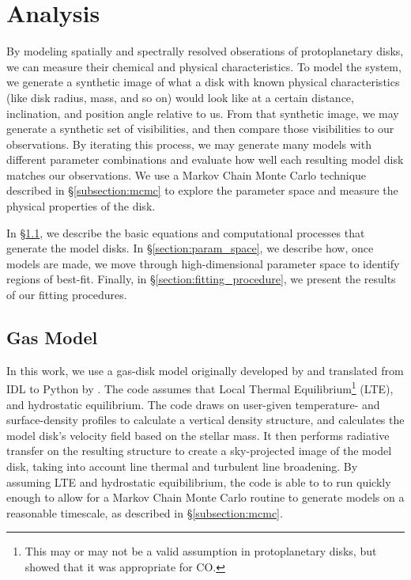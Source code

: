 \chapter{Analysis}
\label{chap:analysis}

By modeling spatially and spectrally resolved obserations of protoplanetary disks, we can measure their chemical and physical characteristics. To model the system, we generate a synthetic image of what a disk with known physical characteristics (like disk radius, mass, and so on) would look like at a certain distance, inclination, and position angle relative to us. From that synthetic image, we may generate a synthetic set of visibilities, and then compare those visibilities to our observations. By iterating this process, we may generate many models with different parameter combinations and evaluate how well each resulting model disk matches our observations. We use a Markov Chain Monte Carlo technique described in \S\ref{subsection:mcmc} to explore the parameter space and measure the physical properties of the disk.


In \S\ref{section:gas_model}, we describe the basic equations and computational processes that generate the model disks. In \S\ref{section:param_space}, we describe how, once models are made, we move through high-dimensional parameter space to identify regions of best-fit. Finally, in \S\ref{section:fitting_procedure}, we present the results of our fitting procedures.


\section{Gas Model}
\label{section:gas_model}

In this work, we use a gas-disk model originally developed by \citep{Rosenfeld2012,Rosenfeld2013} and translated from IDL to Python by \cite{Flaherty2015}. The code assumes that Local Thermal Equilibrium\footnote{This may or may not be a valid assumption in protoplanetary disks, but \cite{Pavlyuchenkov2007} showed that it was appropriate for CO.} (LTE), and hydrostatic equilibrium. The code draws on user-given temperature- and surface-density profiles to calculate a vertical density structure, and calculates the model disk's velocity field based on the stellar mass. It then performs radiative transfer on the resulting structure to create a sky-projected image of the model disk, taking into account line thermal and turbulent line broadening. By assuming LTE and hydrostatic equibilibrium, the code is able to to run quickly enough to allow for a Markov Chain Monte Carlo routine to generate models on a reasonable timescale, as described in \S\ref{subsection:mcmc}.




